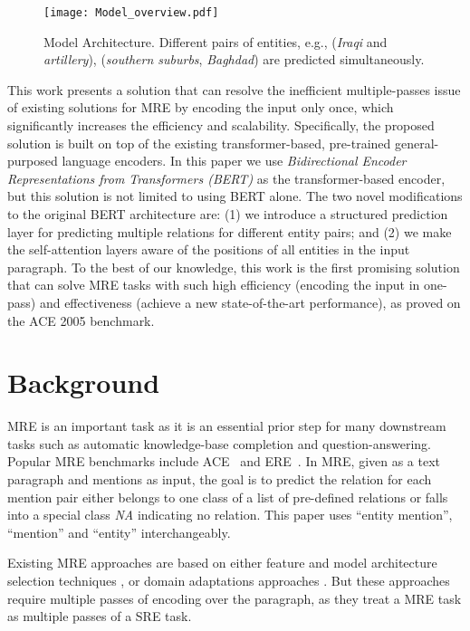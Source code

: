 \documentclass[11pt,a4paper]{article}
\begin{document}
\begin{figure}[t!]
\vspace{-2mm}
  \texttt{[image: Model\_overview.pdf]}
  \caption{\small Model Architecture.  Different pairs of entities, e.g., (\emph{Iraqi} and \emph{artillery}), (\emph{southern suburbs}, \emph{Baghdad}) are predicted simultaneously.
}
  \label{fig:model-overview}
  \vspace{-3mm}
\end{figure}

This work presents a solution that can resolve the inefficient multiple-passes issue of existing solutions for MRE by encoding the input only once, which significantly increases the efficiency and scalability. Specifically, the proposed solution is built on top of the existing transformer-based, pre-trained general-purposed language encoders. In this paper we use \emph{Bidirectional Encoder Representations from Transformers (BERT)} \cite{devlin2018bert} as the transformer-based encoder, but this solution is not limited to using BERT alone. The two novel modifications to the original BERT architecture are: (1) we introduce a structured prediction layer for predicting multiple relations for different entity pairs; and (2) we make the self-attention layers aware of the positions of all entities in the input paragraph. To the best of our knowledge, this work is the first promising solution that can solve MRE tasks with such high efficiency (encoding the input in one-pass) and effectiveness (achieve a new state-of-the-art performance), as proved on the ACE 2005 benchmark.  

\section{Background}
MRE is an important task as it is an essential prior step for many downstream tasks such as automatic knowledge-base completion and question-answering. 
Popular MRE benchmarks  
include ACE~\cite{walker2006ace} and ERE~\cite{ldc2013ere}.   In MRE, given as a text paragraph   and  mentions  as input, the goal is to predict the relation  for each mention pair  either belongs to one class of a list of pre-defined relations  or falls into a special class \emph{NA} indicating no relation.  
This paper uses ``entity mention'', ``mention'' and ``entity'' interchangeably.  

Existing MRE approaches are based on either feature and model architecture selection techniques \cite{xu2015semantic,gormley2015improved, nguyen2015combining,petroni2015core,TUD-CS-2017-0119,song2018n}, or domain adaptations approaches \cite{fu2017domain,shi2018genre}. But these approaches require multiple passes of encoding over the paragraph, as they treat a MRE task as multiple passes of a SRE task.
\end{document}

